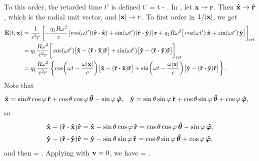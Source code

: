\begin{solution}
	To this order, the retarded time $t'$ is defined
	\beqn \label{rettime}
		t' = t - .
	\eeqn
	In , let $\vb{x} \to \vb{r}$.  Then $\vb{\hat{x}} \to \vb{\hat{r}}$, which is the radial unit vector, and $\abs{\vb{x}} \to r$.  To first order in $1/\abs{\vb{x}}$, we get
	\begin{align*}
		\vE\tx &= \frac{1}{c^2 r} \left[ -\frac{\qq R \omg^2}{r} \left[ \cos(\omg t') (\rh \vdot \xh) + \sin(\omg t') (\rh \vdot \yh) \right] \vr + \qq R \omg^2 \big[ \cos(\omg t') \,\xh + \sin(\omg t') \,\yh \big] \right]_\ret \\
		&= \qq \frac{R \omg^2}{c^2 r} \bigg[ \cos(\omg t') \big[ \xh - (\rh \vdot \xh) \rh \big] + \sin(\omg t') \big[ \yh - (\rh \vdot \yh) \rh \big] \bigg]_\ret \\
		&= \qq \frac{R \omg^2}{c^2 r} \left\{ \cos(\omg t - \frac{\omg \absx}{c}) \big[ \xh - (\rh \vdot \xh) \rh \big] + \sin(\omg t - \frac{\omg \absx}{c}) \big[ \yh - (\rh \vdot \yh) \rh \big] \right\}.
	\end{align*}
	Note that
	\begin{align*}
		\vb{\hat{x}} &= \sin\theta \cos\varphi \,\vb{\hat{r}} + \cos\theta \cos\varphi \,\boldsymbol{\hat{\theta}} - \sin\varphi \,\boldsymbol{\hat{\varphi}}, &
		\vb{\hat{y}} &= \sin\theta \sin\varphi \,\vb{\hat{r}} + \cos\theta \sin\varphi \,\boldsymbol{\hat{\theta}} + \cos\varphi \,\boldsymbol{\hat{\varphi}},
	\end{align*}
	so
	\begin{align*}
		\xh - (\rh \vdot \xh) \rh &= \xh - \sin\tht \cos\vph \,\rh
		= \cos\tht \cos\vph \,\thh - \sin\vph \,\phh, \\
		\yh - (\rh \vdot \yh) \rh &= \yh - \sin\tht \sin\vph \,\rh
		= \cos\tht \sin\vph \,\thh + \cos\vph \,\phh,
	\end{align*}
	and then
	\beq
		\vE\tx = \qq {} .
	\eeq
	Applying  with $\vb{v} = 0$, we have
	\beq
		\vF\tx = \qq \qw {} .
	\eeq
	\vfix
\end{solution}